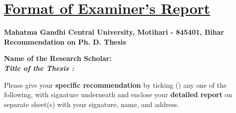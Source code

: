 \chapter*{\uline{Format of Examiner's Report}}

\begin{center} 
\textbf{\normalsize Mahatma Gandhi Central University, Motihari - 845401, Bihar} \\ 
\textbf{\normalsize Recommendation on Ph. D. Thesis} 
\end{center} 
\vspace{-.75cm} 
\begin{flushleft} 
\textbf{Name of the Research Scholar:} \\
\textbf{\textit{Title of the Thesis :}}
\end{flushleft} 

Please give your \textbf{specific recommendation} by ticking (\checkmark) any one of the following, with signature underneath and enclose your \textbf{detailed report} on separate sheet(s) with your signature, name, and address.\vspace{-.25cm}

